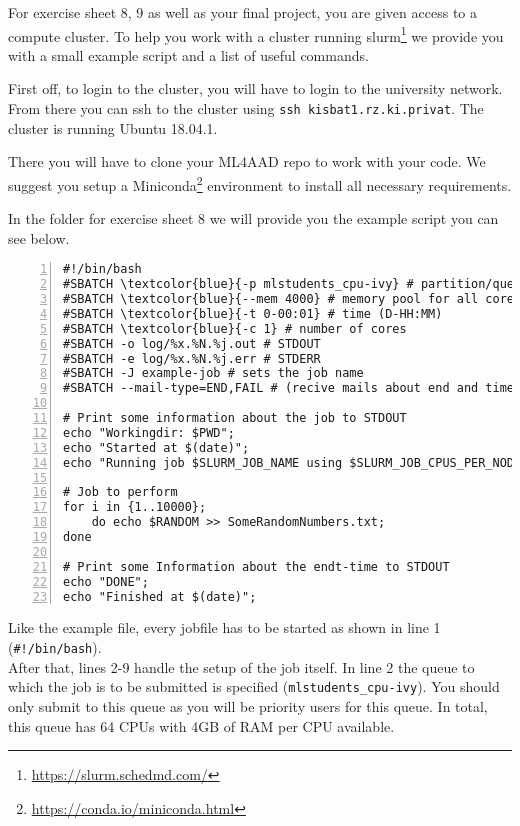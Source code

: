 \documentclass{exam}
\begin{document}
	\noindent For exercise sheet 8, 9 as well as your final project, you are given access to a compute cluster.
	To help you work with a cluster running slurm\footnote{\url{https://slurm.schedmd.com/}} we provide you with a small example script and a list of useful
	commands.
	
	First off, to login to the cluster, you will have to login to the university network. From there you can ssh to the cluster using
	\verb|ssh kisbat1.rz.ki.privat|. The cluster is running Ubuntu 18.04.1.
	
	There you will have to clone your ML4AAD repo to work with your code. We suggest you setup a Miniconda\footnote{\url{https://conda.io/miniconda.html}} environment to install all necessary requirements.
	
	In the folder for exercise sheet 8 we will provide you the example script you can see below.
	\begin{Verbatim}[numbers=left,xleftmargin=5mm, breaklines,commandchars=\\\{\}]
#!/bin/bash
#SBATCH \textcolor{blue}{-p mlstudents_cpu-ivy} # partition/queue
#SBATCH \textcolor{blue}{--mem 4000} # memory pool for all cores (4GB)
#SBATCH \textcolor{blue}{-t 0-00:01} # time (D-HH:MM)
#SBATCH \textcolor{blue}{-c 1} # number of cores
#SBATCH -o log/%x.%N.%j.out # STDOUT
#SBATCH -e log/%x.%N.%j.err # STDERR
#SBATCH -J example-job # sets the job name
#SBATCH --mail-type=END,FAIL # (recive mails about end and timeouts/crashes)

# Print some information about the job to STDOUT
echo "Workingdir: $PWD";
echo "Started at $(date)";
echo "Running job $SLURM_JOB_NAME using $SLURM_JOB_CPUS_PER_NODE cpus per node with given JID $SLURM_JOB_ID on queue $SLURM_JOB_PARTITION";

# Job to perform
for i in {1..10000};
    do echo $RANDOM >> SomeRandomNumbers.txt;
done

# Print some Information about the endt-time to STDOUT
echo "DONE";
echo "Finished at $(date)";
	\end{Verbatim}
	Like the example file, every jobfile has to be started as shown in line 1 (\verb|#!/bin/bash|).\\
	
	\noindent
	After that, lines 2-9 handle the setup of the job itself. In line 2 the queue to which the job is to be submitted is specified
	(\texttt{mlstudents\_cpu-ivy}). You should only submit to this queue
	as you will be priority users for this queue. In total, this queue has 64 CPUs with 4GB of RAM per CPU available.\\
	
\end{document}
